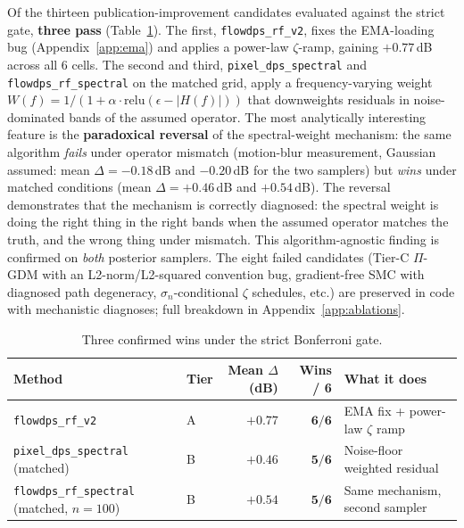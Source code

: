 \documentclass{article}
\begin{document}
Of the thirteen publication-improvement candidates evaluated against
the strict gate, \textbf{three pass} (Table~\ref{tab:ablations_short}).
The first, \texttt{flowdps\_rf\_v2}, fixes the EMA-loading bug
(Appendix~\ref{app:ema}) and applies a power-law $\zeta$-ramp,
gaining $+0.77$\,dB across all 6 cells. The second and third,
\texttt{pixel\_dps\_spectral} and \texttt{flowdps\_rf\_spectral}
on the matched grid, apply a frequency-varying weight
$W(f) = 1/(1 + \alpha \cdot \text{relu}(\epsilon - |H(f)|))$
that downweights residuals in noise-dominated bands of the assumed
operator. The most analytically interesting feature is the
\textbf{paradoxical reversal} of the spectral-weight mechanism: the
same algorithm \emph{fails} under operator mismatch (motion-blur
measurement, Gaussian assumed: mean $\Delta{=}{-}0.18$\,dB and
${-}0.20$\,dB for the two samplers) but \emph{wins} under matched
conditions (mean $\Delta{=}{+}0.46$\,dB and ${+}0.54$\,dB). The reversal
demonstrates that the mechanism is correctly diagnosed: the spectral
weight is doing the right thing in the right bands when the assumed
operator matches the truth, and the wrong thing under mismatch.
This algorithm-agnostic finding is confirmed on \emph{both} posterior
samplers. The eight failed candidates (Tier-C $\Pi$-GDM with an
L2-norm/L2-squared convention bug, gradient-free SMC with diagnosed
path degeneracy, $\sigma_n$-conditional $\zeta$ schedules, etc.) are
preserved in code with mechanistic diagnoses; full breakdown in
Appendix~\ref{app:ablations}.

\begin{table}[h]
  \centering
  \caption{Three confirmed wins under the strict Bonferroni gate.}
  \label{tab:ablations_short}
  \begin{tabular}{llrrl}
    \toprule
    Method & Tier & Mean $\Delta$ (dB) & Wins / 6 & What it does \\
    \midrule
    \texttt{flowdps\_rf\_v2} & A & $\boldsymbol{+0.77}$ & $\boldsymbol{6/6}$ & EMA fix + power-law $\zeta$ ramp \\
    \texttt{pixel\_dps\_spectral} (matched) & B & $\boldsymbol{+0.46}$ & $\boldsymbol{5/6}$ & Noise-floor weighted residual \\
    \texttt{flowdps\_rf\_spectral} (matched, $n{=}100$) & B & $\boldsymbol{+0.54}$ & $\boldsymbol{5/6}$ & Same mechanism, second sampler \\
    \bottomrule
  \end{tabular}
\end{table}
\end{document}
